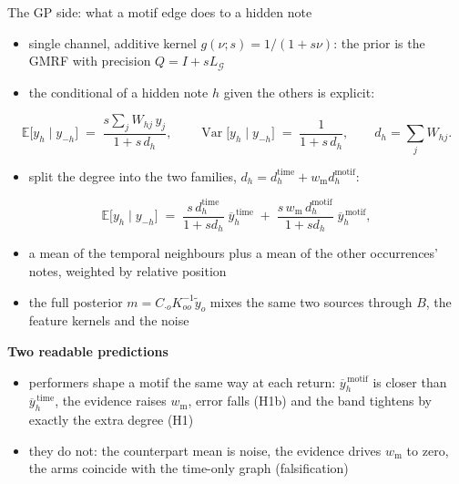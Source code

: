 \documentclass[aspectratio=169,11pt]{beamer}
\newcommand{\Lg}{L_{\mathcal G}}
\begin{document}
\begin{frame}{The GP side: what a motif edge does to a hidden note}
  \footnotesize
  \begin{itemize}
    \item single channel, additive kernel $g(\nu; s) = 1/(1 + s\nu)$: the prior is the GMRF with precision $Q = I + s\Lg$
    \item the conditional of a hidden note $h$ given the others is explicit:
  \end{itemize}
  \vspace{-2mm}
  \[
    \mathbb E\bigl[y_h \mid y_{-h}\bigr] \;=\; \frac{s \sum_{j} W_{hj}\, y_j}{1 + s\, d_h},
    \qquad
    \operatorname{Var}\bigl[y_h \mid y_{-h}\bigr] \;=\; \frac{1}{1 + s\, d_h},
    \qquad d_h = \sum_j W_{hj}.
  \]
  \vspace{-1mm}
  \begin{itemize}
    \item split the degree into the two families, $d_h = d_h^{\text{time}} + w_{\text{m}} d_h^{\text{motif}}$:
  \end{itemize}
  \vspace{-2mm}
  \[
    \mathbb E\bigl[y_h \mid y_{-h}\bigr] \;=\;
    \frac{s\, d_h^{\text{time}}}{1 + s d_h}\;\overline{y}^{\,\text{time}}_h
    \;+\; \frac{s\, w_{\text{m}}\, d_h^{\text{motif}}}{1 + s d_h}\;\overline{y}^{\,\text{motif}}_h,
  \]
  \vspace{-1mm}
  \begin{itemize}
    \item a mean of the temporal neighbours plus a mean of the other occurrences' notes, weighted by relative position
    \item the full posterior $m = C_{\cdot o} K_{oo}^{-1} \tilde y_o$ mixes the same two sources through $B$, the feature kernels and the noise
  \end{itemize}
  \vspace{1mm}
  \textbf{Two readable predictions}
  \begin{itemize}
    \item performers shape a motif the same way at each return: $\overline{y}^{\,\text{motif}}_h$ is closer than $\overline{y}^{\,\text{time}}_h$, the evidence raises $w_{\text{m}}$, error falls (H1b) and the band tightens by exactly the extra degree (H1)
    \item they do not: the counterpart mean is noise, the evidence drives $w_{\text{m}}$ to zero, the arms coincide with the time-only graph (falsification)
  \end{itemize}
\end{frame}
\end{document}
